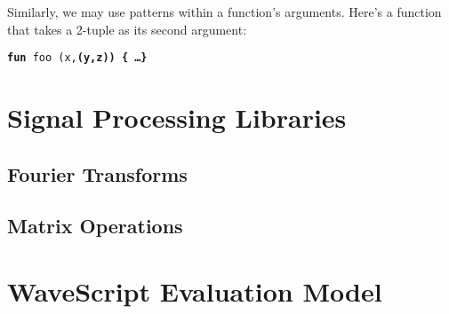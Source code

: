 Similarly, we may use patterns within a function's arguments.  Here's
a function that takes a 2-tuple as its second argument:

\begin{center}
{\tt {\bf fun} foo (x,\bf{(y,z)}) \{ \dots \}}
\end{center}


\chapter{Signal Processing Libraries}

\section{Fourier Transforms}

\section{Matrix Operations}



\chapter{WaveScript Evaluation Model}





